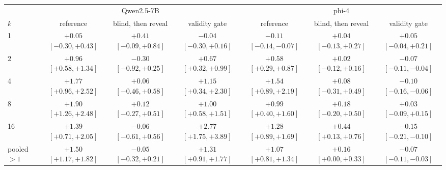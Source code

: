 \begin{tabular}{lcccccc}
\toprule
 & \multicolumn{3}{c}{Qwen2.5-7B} & \multicolumn{3}{c}{phi-4} \\
\cmidrule(lr){2-4}\cmidrule(lr){5-7}
$k$ & reference & blind, then reveal & validity gate & reference & blind, then reveal & validity gate \\
\midrule
1 & $+0.05$ {\scriptsize$[-0.30,+0.43]$} & $+0.41$ {\scriptsize$[-0.09,+0.84]$} & $-0.04$ {\scriptsize$[-0.30,+0.16]$} & $-0.11$ {\scriptsize$[-0.14,-0.07]$} & $+0.04$ {\scriptsize$[-0.13,+0.27]$} & $+0.05$ {\scriptsize$[-0.04,+0.21]$} \\
2 & $+0.96$ {\scriptsize$[+0.58,+1.34]$} & $-0.30$ {\scriptsize$[-0.92,+0.25]$} & $+0.67$ {\scriptsize$[+0.32,+0.99]$} & $+0.58$ {\scriptsize$[+0.29,+0.87]$} & $+0.02$ {\scriptsize$[-0.12,+0.16]$} & $-0.07$ {\scriptsize$[-0.11,-0.04]$} \\
4 & $+1.77$ {\scriptsize$[+0.96,+2.52]$} & $+0.06$ {\scriptsize$[-0.46,+0.58]$} & $+1.15$ {\scriptsize$[+0.34,+2.30]$} & $+1.54$ {\scriptsize$[+0.89,+2.19]$} & $+0.08$ {\scriptsize$[-0.31,+0.49]$} & $-0.10$ {\scriptsize$[-0.16,-0.06]$} \\
8 & $+1.90$ {\scriptsize$[+1.26,+2.48]$} & $+0.12$ {\scriptsize$[-0.27,+0.51]$} & $+1.00$ {\scriptsize$[+0.58,+1.51]$} & $+0.99$ {\scriptsize$[+0.40,+1.60]$} & $+0.18$ {\scriptsize$[-0.20,+0.50]$} & $+0.03$ {\scriptsize$[-0.09,+0.15]$} \\
16 & $+1.39$ {\scriptsize$[+0.71,+2.05]$} & $-0.06$ {\scriptsize$[-0.61,+0.56]$} & $+2.77$ {\scriptsize$[+1.75,+3.89]$} & $+1.28$ {\scriptsize$[+0.89,+1.69]$} & $+0.44$ {\scriptsize$[+0.13,+0.76]$} & $-0.15$ {\scriptsize$[-0.21,-0.10]$} \\
\midrule
pooled $>1$ & $+1.50$ {\scriptsize$[+1.17,+1.82]$} & $-0.05$ {\scriptsize$[-0.32,+0.21]$} & $+1.31$ {\scriptsize$[+0.91,+1.77]$} & $+1.07$ {\scriptsize$[+0.81,+1.34]$} & $+0.16$ {\scriptsize$[+0.00,+0.33]$} & $-0.07$ {\scriptsize$[-0.11,-0.03]$} \\
\bottomrule
\end{tabular}
